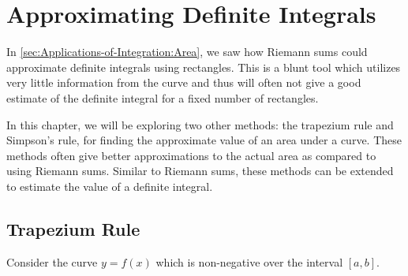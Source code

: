 \section{Approximating Definite Integrals}

In \SS\ref{sec:Applications-of-Integration:Area}, we saw how Riemann sums could approximate definite integrals using rectangles. This is a blunt tool which utilizes very little information from the curve and thus will often not give a good estimate of the definite integral for a fixed number of rectangles.

In this chapter, we will be exploring two other methods: the trapezium rule and Simpson's rule, for finding the approximate value of an area under a curve. These methods often give better approximations to the actual area as compared to using Riemann sums. Similar to Riemann sums, these methods can be extended to estimate the value of a definite integral.

\subsection{Trapezium Rule}

Consider the curve $y = f(x)$ which is non-negative over the interval $[a, b]$.

\begin{figure}[H]
    \centering
    \caption{}
\end{figure}


